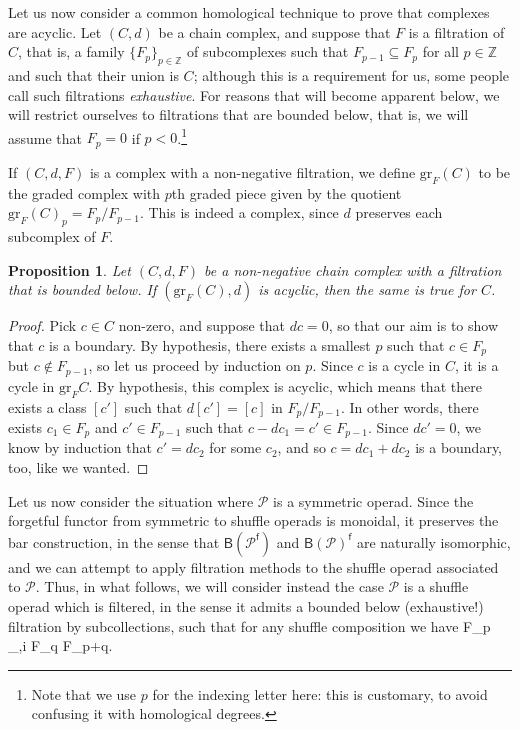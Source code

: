 \documentclass[fleqn, a4paper, twoside]{article}
\makeatletter
\newcommand{\0}{\langle 0\rangle}
\newcommand{\B}[1]{\mathsf{B}(#1)}
\newcommand{\f}{\mathsf{f}}
\let\[\@undefined
\DeclareRobustCommand{\[}{\begin{equation}}%
\let\]\@undefined
\DeclareRobustCommand{\]}{\end{equation}}%
\theoremstyle{mytheorem}
\newtheorem{proposition}[theorem]{Proposition}
\theoremstyle{introthm}
\theoremstyle{mydefinition}
\theoremstyle{mydefinition2}
\theoremstyle{plain} %
\newcommand{\?}{\,?\,}
\newcommand{\PP}{{\mathcal{P}}}
\theoremstyle{mytheorem}
\theoremstyle{plain} %
\makeatother
\begin{document}
Let us now consider a common homological technique to 
prove that complexes are acyclic. Let $(C,d)$ be
a chain complex, and suppose that $F$ is a filtration
of $C$, that is, a family 
$\{ F_p \}_{p\in\mathbb Z}$ of subcomplexes
such that $F_{p-1}\subseteq F_p$ for all
 $p\in \mathbb Z$ and such that their union is
 $C$; although this is a requirement for us, some
 people call such filtrations \emph{exhaustive}. For 
 reasons that will become apparent below,
 we will restrict ourselves to filtrations that are
 bounded below, that is, we will assume that $F_p=0$
 if $p<0$.\footnote{Note that we use $p$ for the
 indexing letter here: this is customary, to avoid
 confusing it with homological degrees.}
 
 If $(C,d,F)$ is a complex with a non-negative
 filtration, we define $\mathrm{gr}_F(C)$ to be
 the graded complex with $p$th graded piece given by
 the quotient $\mathrm{gr}_F(C)_p =   F_p/F_{p-1}$.
 This is indeed a complex, since $d$ preserves 
 each subcomplex of $F$.
 
 \begin{proposition}\label{prop:graded}
 Let $(C,d,F)$ be a non-negative chain
 complex with a filtration that is
 bounded below. If $(\mathrm{gr}_F(C),d)$ is
 acyclic, then the same is true for $C$.
\end{proposition}  
  
  \begin{proof}
  Pick $c\in C$ non-zero, 
  and suppose that $dc=0$,
  so that our aim is to show that $c$ is a boundary.
  By hypothesis, there exists a smallest $p$
  such that $c\in F_p$ but $c\notin F_{p-1}$,
  so let us proceed by induction on $p$.
  Since $c$ is a cycle in $C$, it is a cycle
  in $\mathrm{gr}_F C$. 
  By hypothesis, this complex is acyclic, 
  which means that there exists a class $[c']$
  such that $d[c'] = [c]$ in $F_p/F_{p-1}$. In
  other words, there exists $c_1\in F_p$ and
  $c'\in F_{p-1}$ such that
  $c- dc_1 = c'\in F_{p-1}$.
 Since $dc' = 0$, we know by induction that $c'=dc_2$
 for some $c_2$, and so $c = dc_1+dc_2$ is a
 boundary, too, like we wanted.
  \end{proof}
  
 Let us now consider the situation where $\PP$
 is a symmetric operad. Since the forgetful
 functor from symmetric to shuffle operads is
 monoidal, it preserves the bar construction,
 in the sense that $\B{\PP^\f}$ and
 $\B{\PP}^\f$ are naturally isomorphic,
 and we can attempt to apply filtration methods
 to the shuffle operad associated to $\PP$.
 Thus, in what follows, we will consider instead
 the case $\PP$ is a shuffle operad which is
 filtered, in the sense it admits a bounded
 below (exhaustive!) filtration by subcollections,
 such that for any shuffle composition we have
 \[
 F_p \circ_{\sigma,i} F_q \subseteq
  F_{p+q}.
 \]
 
\end{document}
